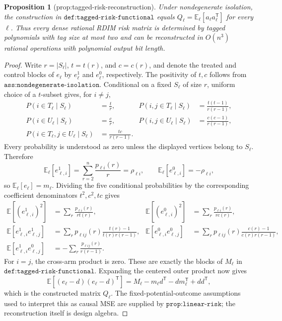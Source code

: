 \documentclass{article}
\newtheorem{proposition}{Proposition}
\begin{document}
\begin{proposition}[prop:tagged-risk-reconstruction]\label{prop:tagged-risk-reconstruction}
Under nondegenerate isolation, the construction in \(\texttt{def:tagged-risk-functional}\) equals \(Q_{\ell}=\mathbb E_{\ell}[a_{\ell}a_{\ell}^{\mathsf T}]\) for every \(\ell\). Thus every dense rational RDIM risk matrix is determined by tagged polynomials with tag size at most two and can be reconstructed in \(O(n^3)\) rational operations with polynomial output bit length.
\end{proposition}
\begin{proof}
Write \(r=|S_\ell|\), \(t=t(r)\), and \(c=c(r)\), and denote the treated and control blocks of \(e_\ell\) by \(e_\ell^1\) and \(e_\ell^0\), respectively.  The positivity of \(t,c\) follows from \(\texttt{ass:nondegenerate-isolation}\).  Conditional on a fixed \(S_\ell\) of size \(r\), uniform choice of a \(t\)-subset gives, for \(i\ne j\),
\[
 \begin{aligned}
 P(i\in T_\ell\mid S_\ell)&=\frac tr,&
 P(i,j\in T_\ell\mid S_\ell)&=\frac{t(t-1)}{r(r-1)},\\
 P(i\in U_\ell\mid S_\ell)&=\frac cr,&
 P(i,j\in U_\ell\mid S_\ell)&=\frac{c(c-1)}{r(r-1)},\\
 P(i\in T_\ell,j\in U_\ell\mid S_\ell)&=\frac{tc}{r(r-1)}.
 \end{aligned}
\]
Every probability is understood as zero unless the displayed vertices belong to \(S_\ell\).  Therefore
\[
 \mathbb E_\ell[e_{\ell,i}^{1}]=\sum_{r=2}^n\frac{p_{\ell i}(r)}r=\rho_{\ell i},
 \qquad
 \mathbb E_\ell[e_{\ell,i}^{0}]=-\rho_{\ell i},
\]
so \(\mathbb E_\ell[e_\ell]=m_\ell\).  Dividing the five conditional probabilities by the corresponding coefficient denominators \(t^2,c^2,tc\) gives
\[
 \begin{aligned}
 \mathbb E[(e_{\ell,i}^{1})^2]&=\sum_r\frac{p_{\ell i}(r)}{rt(r)},&
 \mathbb E[(e_{\ell,i}^{0})^2]&=\sum_r\frac{p_{\ell i}(r)}{rc(r)},\\
 \mathbb E[e_{\ell,i}^{1}e_{\ell,j}^{1}]&=\sum_rp_{\ell ij}(r)\frac{t(r)-1}{t(r)r(r-1)},&
 \mathbb E[e_{\ell,i}^{0}e_{\ell,j}^{0}]&=\sum_rp_{\ell ij}(r)\frac{c(r)-1}{c(r)r(r-1)},\\
 \mathbb E[e_{\ell,i}^{1}e_{\ell,j}^{0}]&=-\sum_r\frac{p_{\ell ij}(r)}{r(r-1)}.
 \end{aligned}
\]
For \(i=j\), the cross-arm product is zero.  These are exactly the blocks of \(M_\ell\) in \(\texttt{def:tagged-risk-functional}\).  Expanding the centered outer product now gives
\[
 \mathbb E[(e_\ell-d)(e_\ell-d)^{\mathsf T}]
 =M_\ell-m_\ell d^{\mathsf T}-d m_\ell^{\mathsf T}+dd^{\mathsf T},
\]
which is the constructed matrix \(Q_\ell\).  The fixed-potential-outcome assumptions used to interpret this as causal MSE are supplied by \(\texttt{prop:linear-risk}\); the reconstruction itself is design algebra.


\end{proof}
\end{document}
